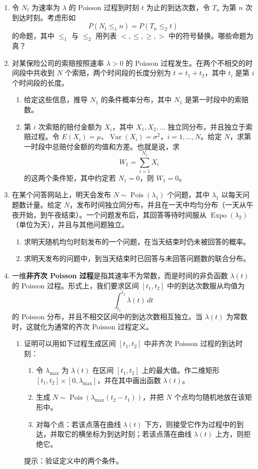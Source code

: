 \documentclass[UTF8, 12pt, fontset=fandol, oneside]{ctexart}
\begin{document}
\begin{enumerate}
  \item 令 $N_t$ 为速率为 $\lambda$ 的 Poisson 过程到时刻 $t$ 为止的到达次数，令 $T_n$ 为第 $n$ 次到达时刻。考虑形如
  \[
    P(N_t \le_1 n)=P(T_n \le_2 t)
  \]
  的命题，其中 $\le_1$ 与 $\le_2$ 用列表 $<,\le,\ge,>$ 中的符号替换。哪些命题为真？

  \item 对某保险公司的索赔按照速率 $\lambda>0$ 的 Poisson 过程发生。在两个不相交的时间段中共收到 $N$ 个索赔，两个时间段的长度分别为 $t=t_1+t_2$，其中 $t_i$ 是第 $i$ 个时间段的长度。
  \begin{enumerate}
    \item 给定这些信息，推导 $N_1$ 的条件概率分布，其中 $N_1$ 是第一时段中的索赔数。
    \item 第 $i$ 次索赔的赔付金额为 $X_i$，其中 $X_1,X_2,\ldots$ 独立同分布，并且独立于索赔过程。令 $E(X_i)=\mu$、$\operatorname{Var}(X_i)=\sigma^2$，$i=1,\ldots,N$。给定 $N$，求第一时段中总赔付金额的均值和方差。也就是说，求
    \[
      W_1=\sum_{i=1}^{N_1}X_i
    \]
    的这两个条件矩，其中约定若 $N_1=0$，则 $W_1=0$。
  \end{enumerate}

  \item 在某个问答网站上，明天会发布 $N\sim\operatorname{Pois}(\lambda_1)$ 个问题，其中 $\lambda_1$ 以每天问题数计量。给定 $N$，发布时间独立同分布，并且在一天中均匀分布（一天从午夜开始，到午夜结束）。一个问题发布后，其回答等待时间服从 $\operatorname{Expo}(\lambda_2)$（单位为天），并且与其他问题独立。
  \begin{enumerate}
    \item 求明天随机均匀时刻发布的一个问题，在当天结束时仍未被回答的概率。
    \item 求明天发布的问题中，到当天结束时已回答与未回答问题数的联合分布。
  \end{enumerate}

  \item 一维\textbf{非齐次 Poisson 过程}是指其速率不为常数，而是时间的非负函数 $\lambda(t)$ 的 Poisson 过程。形式上，我们要求区间 $[t_1,t_2]$ 中的到达次数服从均值为
  \[
    \int_{t_1}^{t_2}\lambda(t)\,dt
  \]
  的 Poisson 分布，并且不相交区间中的到达次数相互独立。当 $\lambda(t)$ 为常数时，这就化为通常的齐次 Poisson 过程定义。
  \begin{enumerate}
    \item 证明可以用如下过程生成区间 $[t_1,t_2]$ 中非齐次 Poisson 过程的到达时刻：
    \begin{enumerate}
      \item 令 $\lambda_{\max}$ 为 $\lambda(t)$ 在区间 $[t_1,t_2]$ 上的最大值。作二维矩形 $[t_1,t_2]\times[0,\lambda_{\max}]$，并在其中画出函数 $\lambda(t)$。
      \item 生成 $N\sim\operatorname{Pois}(\lambda_{\max}(t_2-t_1))$，并把 $N$ 个点均匀随机地放在该矩形中。
      \item 对每个点：若该点落在曲线 $\lambda(t)$ 下方，则接受它作为过程中的到达，并取它的横坐标为到达时刻；若该点落在曲线 $\lambda(t)$ 上方，则拒绝它。
    \end{enumerate}
    提示：验证定义中的两个条件。


\end{enumerate}
\end{enumerate}
\end{document}

